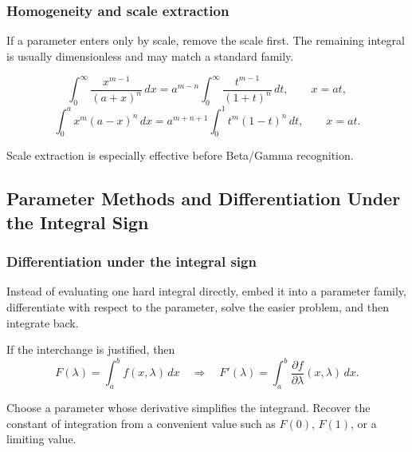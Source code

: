 \newpage
\subsubsection{Homogeneity and scale extraction}
\begin{extension}
If a parameter enters only by scale, remove the scale first.  The remaining
integral is usually dimensionless and may match a standard family.
\end{extension}

\begin{keyformula}[title={Scale-Normalisation Templates}]
\[
\int_0^\infty\frac{x^{m-1}}{(a+x)^n}\,dx
=a^{m-n}\int_0^\infty\frac{t^{m-1}}{(1+t)^n}\,dt,
\qquad x=at,
\]
\[
\int_0^a x^m(a-x)^n\,dx
=a^{m+n+1}\int_0^1 t^m(1-t)^n\,dt,
\qquad x=at.
\]
\end{keyformula}

\begin{examtip}
Scale extraction is especially effective before Beta/Gamma recognition.
\end{examtip}

\newpage
\subsection{Parameter Methods and Differentiation Under the Integral Sign}

\subsubsection{Differentiation under the integral sign}
\begin{extension}
Instead of evaluating one hard integral directly, embed it into a parameter
family, differentiate with respect to the parameter, solve the easier problem,
and then integrate back.
\end{extension}

\begin{keyformula}[title={Parameter Differentiation Template}]
If the interchange is justified, then
\[
F(\lambda)=\int_a^b f(x,\lambda)\,dx
\quad\Rightarrow\quad
F'(\lambda)=\int_a^b \frac{\partial f}{\partial\lambda}(x,\lambda)\,dx.
\]
\end{keyformula}

\begin{examtip}
Choose a parameter whose derivative simplifies the integrand.  Recover the
constant of integration from a convenient value such as \(F(0)\), \(F(1)\), or
a limiting value.
\end{examtip}

